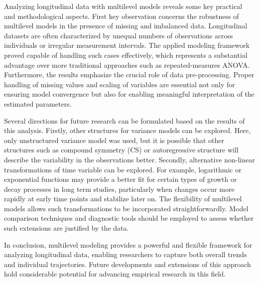 \documentclass[
  12pt,
]{article}
\begin{document}
Analyzing longitudinal data with multilevel models reveals some key
practical and methodological aspects. First key observation concerns the
robustness of multilevel models in the presence of missing and
imbalanced data. Longitudinal datasets are often characterized by
unequal numbers of observations across individuals or irregular
measurement intervals. The applied modeling framework proved capable of
handling such cases effectively, which represents a substantial
advantage over more traditional approaches such as repeated-measures
ANOVA. Furthermore, the results emphasize the crucial role of data
pre-processing. Proper handling of missing values and scaling of
variables are essential not only for ensuring model convergence but also
for enabling meaningful interpretation of the estimated parameters.

Several directions for future research can be formulated based on the
results of this analysis. Firstly, other structures for variance models
can be explored. Here, only unstructured variance model was used, but it
is possible that other structures such as compound symmetry (CS) or
autoregressive structure will describe the variability in the
observations better. Secondly, alternative non-linear transformations of
time variable can be explored. For example, logarithmic or exponential
functions may provide a better fit for certain types of growth or decay
processes in long term studies, particularly when changes occur more
rapidly at early time points and stabilize later on. The flexibility of
multilevel models allows such transformations to be incorporated
straightforwardly. Model comparison techniques and diagnostic tools
should be employed to assess whether such extensions are justified by
the data.

In conclusion, multilevel modeling provides a powerful and flexible
framework for analyzing longitudinal data, enabling researchers to
capture both overall trends and individual trajectories. Future
developments and extensions of this approach hold considerable potential
for advancing empirical research in this field.

\printbibliography
\end{document}
